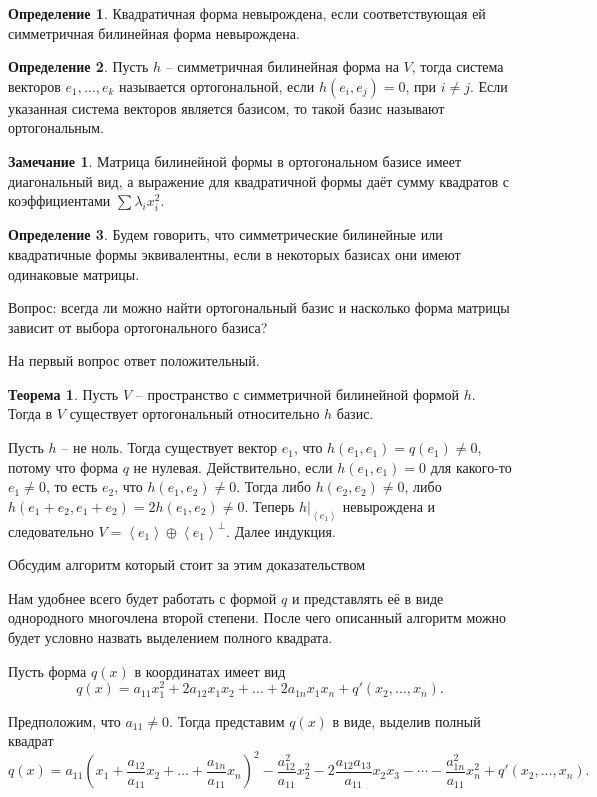 \documentclass[10pt,a4paper,oneside]{book} %
\theoremstyle{definition}
\newtheorem*{rem}{Замечание}
\newtheorem*{defn}{Определение}
\newtheorem{thm}{Теорема}
\def\lan{\left\langle }
\def\ran{\right\rangle}
\def\thrm{\begin{thm}}
\def\ethrm{\end{thm}}
\def\dfn{\begin{defn}}
\def\edfn{\end{defn}}
\def\rm{\begin{rem}}
\def\erm{\end{rem}}
\begin{document}
\dfn Квадратичная форма невырождена, если соответствующая ей симметричная билинейная форма невырождена.
\edfn

\dfn Пусть $h$ -- симметричная билинейная форма на $V$, тогда система векторов $e_1,\dots,e_k$ называется ортогональной, если $h(e_i,e_j)=0$, при $i\neq j$. Если указанная система векторов является базисом, то такой базис называют ортогональным.
\edfn

\rm Матрица билинейной формы в ортогональном базисе имеет диагональный вид, а выражение для квадратичной формы даёт сумму квадратов с коэффициентами $\sum \lambda_i x_i^2$.
\erm

\dfn Будем говорить, что симметрические билинейные или квадратичные формы эквивалентны, если в некоторых базисах они имеют одинаковые матрицы.
\edfn

Вопрос: всегда ли можно найти ортогональный базис и насколько форма матрицы зависит от выбора ортогонального базиса? 

На первый вопрос ответ положительный.

\thrm Пусть $V$ -- пространство с симметричной билинейной формой $h$. Тогда в $V$ существует ортогональный относительно $h$ базис. 
\ethrm
\proof
Пусть $h$ -- не ноль. Тогда существует вектор $e_1$, что $h(e_1,e_1)=q(e_1)\neq 0$, потому что форма $q$ не нулевая. Действительно, если $h(e_1,e_1)=0$ для какого-то $e_1 \neq 0$, то есть $e_2$, что $h(e_1,e_2)\neq 0$. Тогда либо $h(e_2,e_2)\neq 0$, либо $h(e_1+e_2,e_1+e_2)=2h(e_1,e_2)\neq 0$. 
Теперь $h|_{\lan e_1\ran}$ невырождена и следовательно $V=\lan e_1 \ran \oplus \lan e_1 \ran^{\bot}$. Далее индукция.
\endproof







Обсудим алгоритм который стоит за этим доказательством


Нам удобнее всего будет работать с формой $q$ и представлять её в виде однородного многочлена второй степени. После чего описанный алгоритм можно будет условно назвать выделением полного квадрата.

Пусть форма $q(x)$ в координатах имеет вид
$$q(x)= a_{11}x_1^2+ 2a_{12}x_1x_2 + \dots + 2a_{1n}x_1x_n  + q'(x_2, \dots, x_n).$$

 Предположим, что $a_{11}\neq 0$. Тогда представим $q(x)$ в виде, выделив полный квадрат 
$$q(x)= a_{11}\left(x_1+\frac{a_{12}}{a_{11}}x_2 + \dots +\frac{a_{1n}}{a_{11}}x_n\right)^2 - \frac{a_{12}^2}{a_{11}}x_2^2 - 2\frac{a_{12}a_{13}}{a_{11}}x_2x_3 - \cdots - \frac{a_{1n}^2}{a_{11}}x_n^2 + q'(x_2,\dots,x_n).$$
\end{document}
